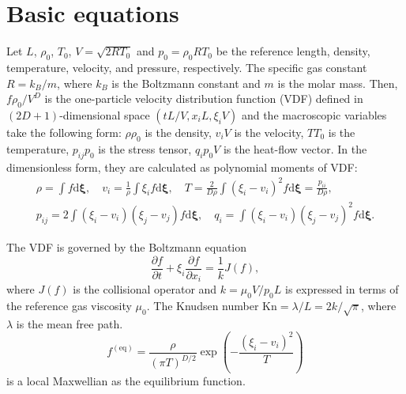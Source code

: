 \documentclass[]{elsarticle} %
\newcommand{\Kn}{\mathrm{Kn}}
\newcommand{\dd}{\mathrm{d}}
\newcommand{\pder}[2][]{\frac{\partial#1}{\partial#2}}
\newcommand{\dxi}{\boldsymbol{\dd\xi}}
\newcommand{\equil}[1]{#1^\mathrm{(eq)}}
\newcommand{\refer}[1]{#1_0}
\begin{document}
{\section{Basic equations}\label{sec:equations}

Let \(L\), \(\refer\rho\), \(\refer{T}\), \(V = \sqrt{2R\refer{T}}\) and \(\refer{p} = \refer{\rho}R\refer{T}\) be
the reference length, density, temperature, velocity, and pressure, respectively.
The specific gas constant \(R = k_B/m\), where \(k_B\) is the Boltzmann constant and \(m\) is the molar mass.
Then, \(f\refer{\rho}/V^D\) is the one-particle velocity distribution function (VDF)
defined in \((2D+1)\)-dimensional space \((tL/V, x_iL, \xi_iV)\) and
the macroscopic variables take the following form:
\(\rho\refer{\rho}\) is the density, \(v_iV\) is the velocity, \(T\refer{T}\) is the temperature,
\(p_{ij}\refer{p}\) is the stress tensor, \(q_i\refer{p}V\) is the heat-flow vector.
In the dimensionless form, they are calculated as polynomial moments of VDF:
\begin{equation}\label{eq:macro}
    \begin{gathered}
    \rho = \int f \dxi, \quad
    v_i = \frac1{\rho} \int \xi_i f \dxi, \quad
    T = \frac{2}{D\rho}\int(\xi_i-v_i)^2 f \dxi = \frac{p_{ii}}{D\rho}, \\
    p_{ij} = 2 \int(\xi_i-v_i)(\xi_j-v_j) f \dxi, \quad
    q_i = \int(\xi_i-v_i)(\xi_j-v_j)^2 f \dxi.
    \end{gathered}
\end{equation}

The VDF is governed by the Boltzmann equation
\begin{equation}\label{eq:Boltzmann}
    \pder[f]{t} + \xi_i\pder[f]{x_i} = \frac1kJ(f),
\end{equation}
where \(J(f)\) is the collisional operator and \(k=\refer\mu V/\refer{p}L\)
is expressed in terms of the reference gas viscosity \(\refer\mu\).
The Knudsen number \(\Kn=\lambda/L = 2k/\sqrt\pi\), where \(\lambda\) is the mean free path.
\begin{equation}\label{eq:equilibrium}
    \equil{f} = \frac{\rho}{(\pi T)^{D/2}}\exp\left(-\frac{(\xi_i - v_i)^2}T\right)
\end{equation}
is a local Maxwellian as the equilibrium function.

}
\end{document}
